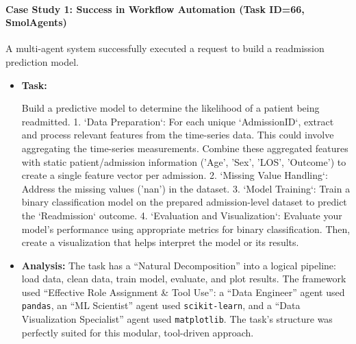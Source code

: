 \documentclass{article}
\begin{document}
\paragraph{Case Study 1: Success in Workflow Automation (Task ID=66, SmolAgents)}
A multi-agent system successfully executed a request to build a readmission prediction model.
\begin{itemize}
    \item \textbf{Task:}
    \begin{tcolorbox}[colback=cadmiumgreen!5!white,colframe=forestgreen!75!white,breakable,title=\textit{Task.}]
    \begin{VerbatimWrap}
Build a predictive model to determine the likelihood of a patient being readmitted.
1. `Data Preparation`: For each unique `AdmissionID`, extract and process relevant features from the time-series data. This could involve aggregating the time-series measurements. Combine these aggregated features with static patient/admission information ('Age', 'Sex', 'LOS', 'Outcome') to create a single feature vector per admission.
2. `Missing Value Handling`: Address the missing values ('nan') in the dataset.
3. `Model Training`: Train a binary classification model on the prepared admission-level dataset to predict the `Readmission` outcome.
4. `Evaluation and Visualization`: Evaluate your model's performance using appropriate metrics for binary classification. Then, create a visualization that helps interpret the model or its results.
    \end{VerbatimWrap}
    \end{tcolorbox}
    \item \textbf{Analysis:} The task has a ``Natural Decomposition'' into a logical pipeline: load data, clean data, train model, evaluate, and plot results. The framework used ``Effective Role Assignment \& Tool Use'': a ``Data Engineer'' agent used \texttt{pandas}, an ``ML Scientist'' agent used \texttt{scikit-learn}, and a ``Data Visualization Specialist'' agent used \texttt{matplotlib}. The task's structure was perfectly suited for this modular, tool-driven approach.
\end{itemize}
\end{document}
